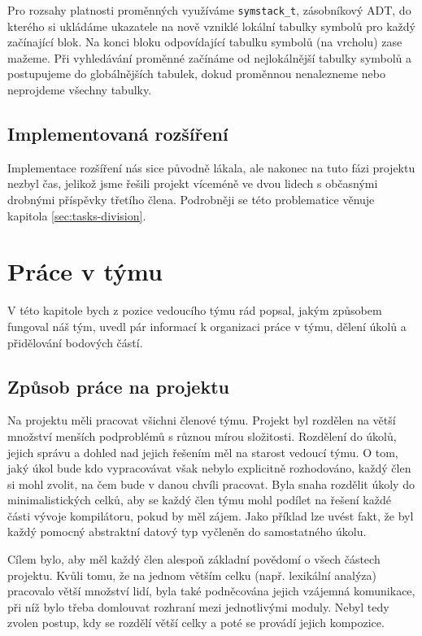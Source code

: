 \documentclass[11pt,a4paper]{article}
\begin{document}
    Pro rozsahy platnosti proměnných využíváme \texttt{symstack\_t}, zásobníkový ADT, do kterého si ukládáme ukazatele na nově vzniklé lokální tabulky symbolů pro každý začínající blok. Na konci bloku odpovídající tabulku symbolů (na vrcholu) zase mažeme. Při vyhledávání proměnné začínáme od nejlokálnější tabulky symbolů a postupujeme do globálnějších tabulek, dokud proměnnou nenalezneme nebo neprojdeme všechny tabulky.
    
    \subsection{Implementovaná rozšíření}
    
    Implementace rozšíření nás sice původně lákala, ale nakonec na tuto fázi projektu nezbyl čas, jelikož jsme řešili projekt víceméně ve dvou lidech s občasnými drobnými příspěvky třetího člena. Podrobněji se této problematice věnuje kapitola \ref{sec:tasks-division}.
    
\section{Práce v týmu}
\label{sec:team-work}

V této kapitole bych z pozice vedoucího týmu rád popsal, jakým způsobem fungoval náš tým, uvedl pár informací k organizaci práce v týmu, dělení úkolů a přidělování bodových částí.

\subsection{Způsob práce na projektu}
\label{sec:way-to-work-on-project}

Na projektu měli pracovat všichni členové týmu. Projekt byl rozdělen na větší množství menších podproblémů s různou mírou složitosti. Rozdělení do úkolů, jejich správu a dohled nad jejich řešením měl na starost vedoucí týmu. O tom, jaký úkol bude kdo vypracovávat však nebylo explicitně rozhodováno, každý člen si mohl zvolit, na čem bude v danou chvíli pracovat. Byla snaha rozdělit úkoly do minimalistických celků, aby se každý člen týmu mohl podílet na řešení každé části vývoje kompilátoru, pokud by měl zájem. Jako příklad lze uvést fakt, že byl každý pomocný abstraktní datový typ vyčleněn do samostatného úkolu.

Cílem bylo, aby měl každý člen alespoň základní povědomí o všech částech projektu. Kvůli tomu, že na jednom větším celku (např. lexikální analýza) pracovalo větší množství lidí, byla také podněcována jejich vzájemná komunikace, při níž bylo třeba domlouvat rozhraní mezi jednotlivými moduly. Nebyl tedy zvolen postup, kdy se rozdělí větší celky a poté se provádí jejich kompozice.
\end{document}
